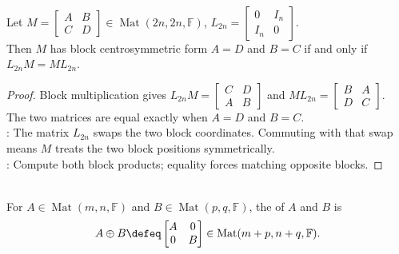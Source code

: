 \begin{proposition} \label{prop:block-centrosymmetric-commutation} \\
Let $M=
\begin{bmatrix}
A & B\\
C & D
\end{bmatrix}\in\operatorname{Mat}(2n,2n,\mathbb{F})$,
$L_{2n}=
\begin{bmatrix}
0 & I_n\\
I_n & 0
\end{bmatrix}$.\\
Then $M$ has block centrosymmetric form $A=D$ and $B=C$ if and only if $L_{2n}M=ML_{2n}$.
\begin{proof}
Block multiplication gives $L_{2n}M=
\begin{bmatrix}
C & D\\
A & B
\end{bmatrix}$ and 
$ML_{2n}=
\begin{bmatrix}
B & A\\
D & C
\end{bmatrix}$.\\
The two matrices are equal exactly when $A=D$ and $B=C$.\\
: The matrix $L_{2n}$ swaps the two block coordinates. Commuting with that swap means $M$ treats the two block positions symmetrically.\\
: Compute both block products; equality forces matching opposite blocks.
\end{proof}
\end{proposition}

\begin{definition} \\
For $A\in\operatorname{Mat}(m,n,\mathbb{F})$ and $B\in\operatorname{Mat}(p,q,\mathbb{F})$, the  of $A$ and $B$ is
\begin{align}
A\oplus B\defeq
\begin{bmatrix}
A & 0\\
0 & B
\end{bmatrix}
\in\operatorname{Mat}(m+p,n+q,\mathbb{F}).
\nonumber
\end{align}
\end{definition}

